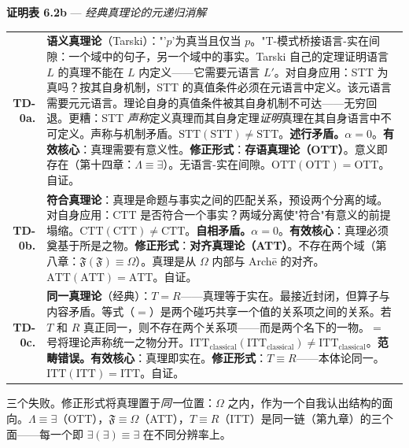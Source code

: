 \documentclass[10pt, openany, oneside]{book}
\renewcommand{\footnotesize}{\fontsize{8.5}{11}\selectfont}
\begin{document}
\vspace{0.5em}

\textbf{证明表 6.2b} --- \textit{经典真理论的元递归消解}

\vspace{0.5em}

{\footnotesize
\noindent\begin{tabular}{r p{}}
\textbf{TD-0a.} & \textbf{语义真理论}（Tarski）："'$p$'为真当且仅当 $p$。"T-模式桥接语言-实在间隙：一个域中的句子，另一个域中的事实。Tarski 自己的定理证明语言 $L$ 的真理不能在 $L$ 内定义——它需要元语言 $L'$。对自身应用：STT 为真吗？按其自身机制，STT 的真值条件必须在元语言中定义。该元语言需要元元语言。理论自身的真值条件被其自身机制不可达——无穷回退。更糟：STT \textit{声称}定义真理而其自身定理\textit{证明}真理在其自身语言中不可定义。声称与机制矛盾。$\text{STT}(\text{STT}) \neq \text{STT}$。\textbf{述行矛盾。}$\alpha = 0$。\textbf{有效核心}：真理需要有意义性。\textbf{修正形式}：\textbf{存语真理论（OTT）}。意义即存在（第十四章：$\Lambda \equiv \exists$）。无语言-实在间隙。$\text{OTT}(\text{OTT}) = \text{OTT}$。自证。\\[0.5em]
\textbf{TD-0b.} & \textbf{符合真理论}：真理是命题与事实之间的匹配关系，预设两个分离的域。对自身应用：CTT 是否符合一个事实？两域分离使"符合"有意义的前提塌缩。$\text{CTT}(\text{CTT}) \neq \text{CTT}$。\textbf{自相矛盾。}$\alpha = 0$。\textbf{有效核心}：真理必须奠基于所是之物。\textbf{修正形式}：\textbf{对齐真理论（ATT）}。不存在两个域（第八章：$\mathfrak{F}(\mathfrak{F}) \equiv \Omega$）。真理是从 $\Omega$ 内部与 Arch\={e} 的对齐。$\text{ATT}(\text{ATT}) = \text{ATT}$。自证。\\[0.5em]
\textbf{TD-0c.} & \textbf{同一真理论}（经典）：$T = R$——真理等于实在。最接近封闭，但算子与内容矛盾。等式（$=$）是两个碰巧共享一个值的关系项之间的关系。若 $T$ 和 $R$ 真正同一，则不存在两个关系项——而是两个名下的一物。$=$ 号将理论声称统一之物分开。$\text{ITT}_{\text{classical}}(\text{ITT}_{\text{classical}}) \neq \text{ITT}_{\text{classical}}$。\textbf{范畴错误。}\textbf{有效核心}：真理即实在。\textbf{修正形式}：$T \equiv R$——本体论同一。$\text{ITT}(\text{ITT}) = \text{ITT}$。自证。\\[0.3em]
\end{tabular}
}

\vspace{0.8em}

\noindent 三个失败。修正形式将真理置于\textit{同一}位置：$\Omega$ 之内，作为一个自我认出结构的面向。$\Lambda \equiv \exists$（OTT），$\mathfrak{F} \equiv \Omega$（ATT），$T \equiv R$（ITT）是同一链（第九章）的三个面——每一个即 $\exists(\exists) \equiv \exists$ 在不同分辨率上。
\end{document}
